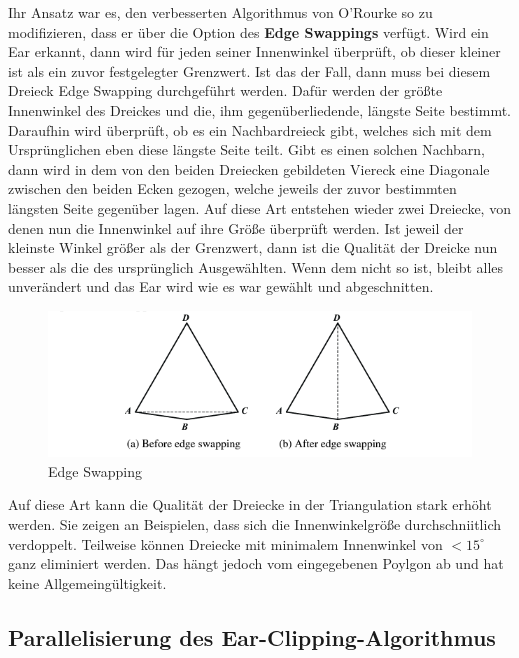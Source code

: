 Ihr Ansatz war es, den verbesserten Algorithmus von O'Rourke so zu modifizieren, dass er über die Option des \textbf{Edge Swappings} verfügt.
Wird ein Ear erkannt, dann wird für jeden seiner Innenwinkel überprüft, ob dieser kleiner ist als ein zuvor festgelegter Grenzwert. Ist das der Fall, dann 
muss bei diesem Dreieck Edge Swapping durchgeführt werden. Dafür werden der größte Innenwinkel des Dreickes und die, ihm gegenüberliedende, längste Seite bestimmt.
Daraufhin wird überprüft, ob es ein Nachbardreieck gibt, welches sich mit dem Ursprünglichen eben diese längste Seite teilt. Gibt es einen solchen Nachbarn, 
dann wird in dem von den beiden Dreiecken gebildeten Viereck eine Diagonale zwischen den beiden Ecken gezogen, welche jeweils der zuvor bestimmten längsten Seite gegenüber lagen.
Auf diese Art entstehen wieder zwei Dreiecke, von denen nun die Innenwinkel auf ihre Größe überprüft werden. Ist jeweil der kleinste Winkel größer als der Grenzwert, 
dann ist die Qualität der Dreicke nun besser als die des ursprünglich Ausgewählten. Wenn dem nicht so ist, bleibt alles unverändert und das Ear wird wie es war gewählt und abgeschnitten.

\begin{figure}[h]
    \includegraphics[width=1\textwidth]{bilder/edgeswapping.png}
    \caption[Edge Swapping]{Edge Swapping \cite{earclipping}}
    \label{fig:edgeswapping}
\end{figure}

Auf diese Art kann die Qualität der Dreiecke in der Triangulation stark erhöht werden. Sie zeigen an Beispielen, dass sich die Innenwinkelgröße durchschniitlich verdoppelt.
Teilweise können Dreiecke mit minimalem Innenwinkel von $< 15^\circ$ ganz eliminiert werden. Das hängt jedoch vom eingegebenen Poylgon ab und hat keine Allgemeingültigkeit.

\subsection{Parallelisierung des Ear-Clipping-Algorithmus}

